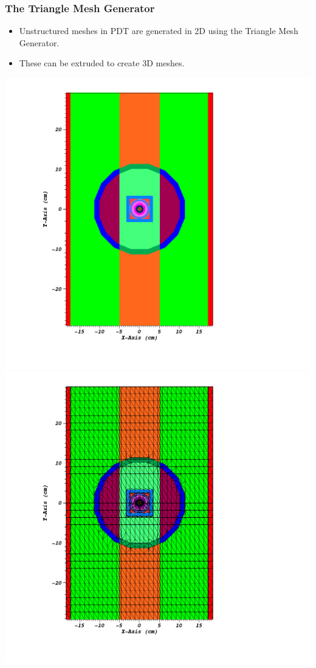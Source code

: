 \documentclass[compress]{beamer}
\begin{document}
\begin{frame}[t]\frametitle{The Triangle Mesh Generator}
	\begin{block}{}
	\begin{itemize}
		\item Unstructured meshes in PDT are generated in 2D using the Triangle Mesh Generator.
		\item These can be extruded to create 3D meshes.
	\end{itemize}	
	\end{block}
	\includegraphics[scale = 0.15]{figures/IM12DPoly.png}
	\includegraphics[scale = 0.15]{figures/IM12DMesh.png}
\end{frame}
\end{document}
